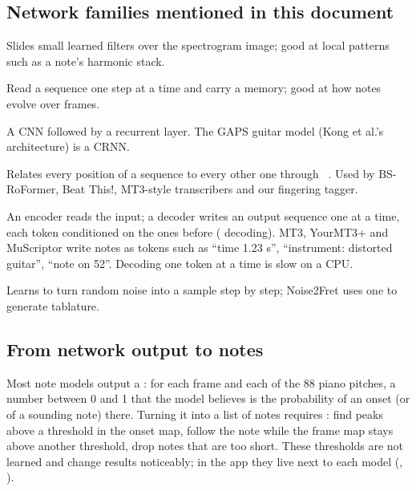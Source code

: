 \subsection{Network families mentioned in this document}

\begin{description}[style=nextline,leftmargin=1.2cm]
\item[CNN (convolutional neural network)] Slides small learned filters over the
  spectrogram image; good at local patterns such as a note's harmonic stack.
\item[RNN / GRU / LSTM (recurrent networks)] Read a sequence one step at a time
  and carry a memory; good at how notes evolve over frames.
\item[CRNN] A CNN followed by a recurrent layer. The GAPS guitar model (Kong et
  al.'s architecture) is a CRNN.
\item[Transformer] Relates every position of a sequence to every other one
  through ~\cite{vaswani2017attention}. Used by BS-RoFormer,
  Beat This!, MT3-style transcribers and our fingering tagger.
\item[Encoder-decoder / sequence-to-sequence] An encoder reads the input; a
  decoder writes an output sequence one  at a time, each token
  conditioned on the ones before ( decoding). MT3,
  YourMT3+ and MuScriptor write notes as tokens such as ``time 1.23 s'',
  ``instrument: distorted guitar'', ``note on 52''. Decoding one token at a time
  is slow on a CPU.
\item[Diffusion model] Learns to turn random noise into a sample step by step;
  Noise2Fret uses one to generate tablature.
\end{description}

\subsection{From network output to notes}

Most note models output a : for each frame and each of the
88 piano pitches, a number between 0 and 1 that the model believes is the
probability of an onset (or of a sounding note) there. Turning it into a list of
notes requires : find peaks above a threshold in the
onset map, follow the note while the frame map stays above another threshold,
drop notes that are too short. These thresholds are not learned and change
results noticeably; in the app they live next to each model
(, ).


